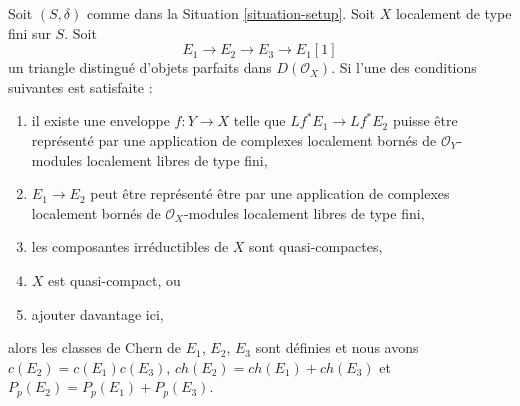 \begin{lemma}
\label{lemma-additivity-on-perfect}
Soit $(S, \delta)$ comme dans la Situation \ref{situation-setup}.
Soit $X$ localement de type fini sur $S$. Soit
$$
E_1 \to E_2 \to E_3 \to E_1[1]
$$
un triangle distingué d'objets parfaits dans $D(\mathcal{O}_X)$.
Si l'une des conditions suivantes est satisfaite :
\begin{enumerate}
\item il existe une enveloppe $f : Y \to X$ telle que
$Lf^*E_1 \to Lf^*E_2$ puisse être représenté par une application de complexes
localement bornés de $\mathcal{O}_Y$-modules localement libres de type fini,
\item $E_1 \to E_2$ peut être représenté être par une application de complexes localement bornés
de $\mathcal{O}_X$-modules localement libres de type fini,
\item les composantes irréductibles de $X$ sont quasi-compactes,
\item $X$ est quasi-compact, ou
\item ajouter davantage ici,
\end{enumerate}
alors les classes de Chern de $E_1$, $E_2$, $E_3$ sont définies et nous avons
$c(E_2) = c(E_1) c(E_3)$, $ch(E_2) = ch(E_1) + ch(E_3)$ et
$P_p(E_2) = P_p(E_1) + P_p(E_3)$.
\end{lemma}

